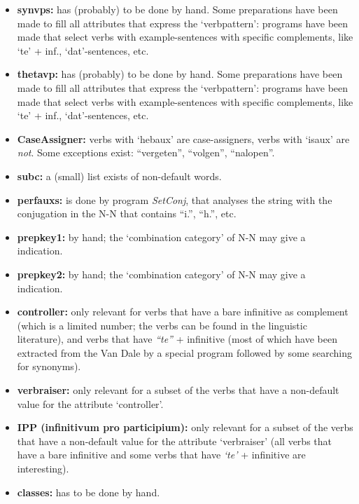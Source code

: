 \begin{itemize}
  \item {\bf synvps:} has (probably) to be done by hand. Some preparations 
        have been made to fill all attributes that express the `verbpattern': 
        programs have been made that select verbs with example-sentences with 
        specific complements, like `te' + inf., `dat'-sentences, etc.
 
  \item {\bf thetavp:} has (probably) to be done by hand. Some preparations 
        have been made to fill all attributes that express the `verbpattern': 
        programs have been made that select verbs with example-sentences with 
        specific complements, like `te' + inf., `dat'-sentences, etc.
 
  \item {\bf CaseAssigner:} verbs with `hebaux' are case-assigners, verbs with
        `isaux' are {\em not}. Some exceptions exist: ``vergeten'', ``volgen'', 
        ``nalopen''.
 
  \item {\bf subc:} a (small) list exists of non-default words.
 
  \item {\bf perfauxs:} is done by program {\em SetConj}, that analyses
        the string with the conjugation in the N-N that contains 
        ``i.'', ``h.'', etc.
 
  \item {\bf prepkey1:} by hand; the `combination category' of N-N may 
        give a indication.
 
  \item {\bf prepkey2:} by hand; the `combination category' of N-N may 
        give a indication.
 
  \item {\bf controller:} only relevant for verbs that have a bare infinitive
        as complement (which is a limited number; the verbs can be found in the 
        linguistic literature), and verbs that have {\em ``te''} + infinitive 
        (most of which have been extracted from the Van Dale by a special 
        program followed by some searching for synonyms).
 
  \item {\bf verbraiser:} only relevant for a subset of the verbs that have a 
        non-default value for the attribute `controller'.
 
  \item {\bf IPP (infinitivum pro participium):} only relevant for a subset 
        of the verbs that have a non-default value for the attribute 
        `verbraiser' (all verbs that have a bare infinitive and some verbs 
        that have {\em `te'} + infinitive are interesting).
 
  \item {\bf classes:} has to be done by hand.
\end{itemize}
 
